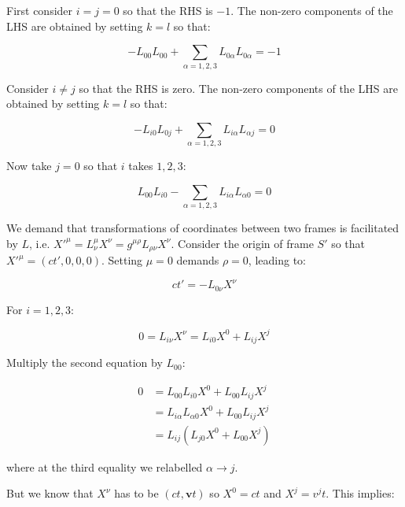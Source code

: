 \documentclass[12pt]{article}
\begin{document}
First consider $i = j = 0$ so that the RHS is $-1$. The non-zero components of the LHS are obtained by setting $k = l$ so that:

\begin{equation}
    -L_{00}L_{00} + \sum_{\alpha = 1, 2, 3} L_{0\alpha}L_{0\alpha} = -1
\end{equation}

Consider $i \ne j$ so that the RHS is zero. The non-zero components of the LHS are obtained by setting $k = l$ so that:

\begin{equation}
    -L_{i0}L_{0j} + \sum_{\alpha = 1, 2, 3} L_{i\alpha}L_{\alpha j} = 0
\end{equation}

Now take $j = 0$ so that $i$ takes $1, 2, 3$:

\begin{equation}
    L_{00}L_{i0} - \sum_{\alpha = 1, 2, 3} L_{i\alpha}L_{\alpha 0} = 0
\end{equation}

We demand that transformations of coordinates between two frames is facilitated by $L$, i.e. $X'^{\mu} = L^{\mu}_{\nu} X^{\nu} = g^{\mu \rho} L_{\rho \nu} X^{\nu}$. Consider the origin of frame $S'$ so that $X'^{\mu} = (ct', 0, 0, 0)$. Setting $\mu = 0$ demands $\rho = 0$, leading to:

\begin{equation}
    ct' = -L_{0 \nu} X^{\nu}
\end{equation}

For $i = 1, 2, 3$:

\begin{equation}
    0 = L_{i \nu} X^{\nu} = L_{i 0} X^{0} + L_{i j} X^{j}
\end{equation}

Multiply the second equation by $L_{00}$:

\begin{equation}
    \begin{split}
        0 &= L_{00}L_{i 0}X^{0} + L_{00}L_{i j} X^{j} \\
        &= L_{i\alpha}L_{\alpha 0} X^{0} + L_{00}L_{i j} X^{j} \\
        &= L_{ij} (L_{j0} X^{0} + L_{00} X^{j})
    \end{split}
\end{equation}

where at the third equality we relabelled $\alpha \to j$.

But we know that $X^{\nu}$ has to be $(ct, \mathbf{v}t)$ so $X^{0} = ct$ and $X^{j} = v^{j}t$. This implies:
\end{document}
